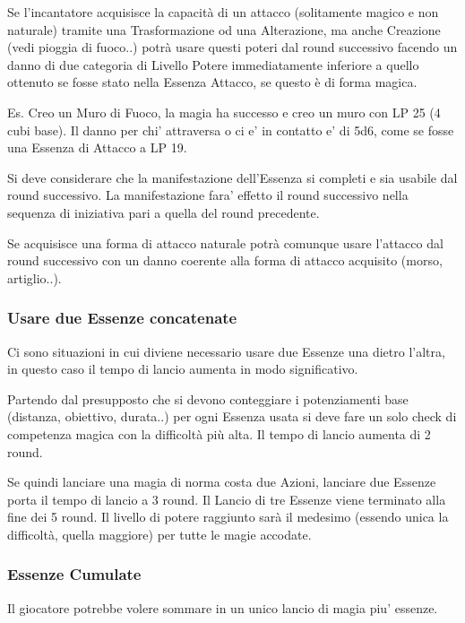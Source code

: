 \documentclass[a4paper,11pt,twoside,openany]{book}
\begin{document}
Se l'incantatore acquisisce la capacità di un attacco (solitamente magico e non naturale) tramite una Trasformazione od una Alterazione, ma anche Creazione (vedi pioggia di fuoco..) potrà usare questi poteri dal round successivo facendo un danno di due categoria di Livello Potere immediatamente inferiore a quello ottenuto se fosse stato nella Essenza Attacco, se questo è di forma magica.

Es. Creo un Muro di Fuoco, la magia ha successo e creo un muro con LP 25 (4 cubi base). Il danno per chi' attraversa o ci e' in contatto e' di 5d6, come se fosse una Essenza di Attacco a LP 19.

Si deve considerare che la manifestazione dell'Essenza si completi e sia usabile dal round successivo. La manifestazione fara' effetto il round successivo nella sequenza di iniziativa pari a quella del round precedente.

Se acquisisce una forma di attacco naturale potrà comunque usare l'attacco dal round successivo con un danno coerente alla forma di attacco acquisito (morso, artiglio..).

\subsubsection{Usare due Essenze concatenate}

Ci sono situazioni in cui diviene necessario usare due Essenze una dietro l'altra, in questo caso il tempo di lancio aumenta in modo significativo.

Partendo dal presupposto che si devono conteggiare i potenziamenti base (distanza, obiettivo, durata..) per ogni Essenza usata si deve fare un solo check di competenza magica con la difficoltà più alta. Il tempo di lancio aumenta di 2 round.

Se quindi lanciare una magia di norma costa due Azioni, lanciare due Essenze porta il tempo di lancio a 3 round. Il Lancio di tre Essenze viene terminato alla fine dei 5 round. Il livello di potere raggiunto sarà il medesimo (essendo unica la difficoltà, quella maggiore) per tutte le magie accodate.

\subsubsection{Essenze Cumulate}

Il giocatore potrebbe volere sommare in un unico lancio di magia piu' essenze.
\end{document}

